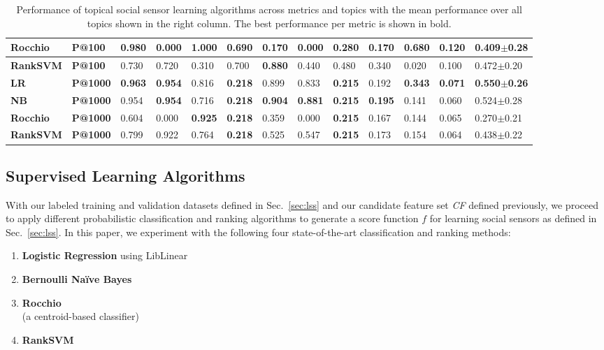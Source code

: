 \begin{table*}[t!]
{{\begin{tabular}{|l|l|l|l|l|l|l|l|l|l|l|l|l|}
\textbf{Rocchio} & \textbf{P@100} & \textbf{0.980} & 0.000 & \textbf{1.000} & 0.690 & 0.170 & 0.000 & 0.280 & 0.170 & 0.680 & 0.120 & 0.409$\pm$0.28 \\ \hline
\textbf{RankSVM} & \textbf{P@100} & 0.730 & 0.720 & 0.310 & 0.700 & \textbf{0.880} & 0.440 & 0.480 & 0.340 & 0.020 & 0.100 & 0.472$\pm$0.20 \\ \hline \hline
\textbf{LR} & \textbf{P@1000} & \textbf{0.963} & \textbf{0.954} & 0.816 & \textbf{0.218} & 0.899 & 0.833 & \textbf{0.215} & 0.192 & \textbf{0.343} & \textbf{0.071} & \textbf{0.550$\pm$0.26} \\ \hline
\textbf{NB} & \textbf{P@1000} & 0.954 & \textbf{0.954} & 0.716 & \textbf{0.218} & \textbf{0.904} & \textbf{0.881} & \textbf{0.215} & \textbf{0.195} & 0.141 & 0.060 & 0.524$\pm$0.28 \\ \hline
\textbf{Rocchio} & \textbf{P@1000} & 0.604 & 0.000 & \textbf{0.925} & \textbf{0.218} & 0.359 & 0.000 & \textbf{0.215} & 0.167 & 0.144 & 0.065 & 0.270$\pm$0.21 \\ \hline
\textbf{RankSVM} & \textbf{P@1000} & 0.799 & 0.922 & 0.764 & \textbf{0.218} & 0.525 & 0.547 & \textbf{0.215} & 0.173 & 0.154 & 0.064 & 0.438$\pm$0.22 \\ \hline
\end{tabular}
}}
\caption{Performance of topical social sensor learning algorithms across metrics and topics with the
mean performance over all topics shown in the right column.  The best performance per metric is shown in bold.} 
\label{table:results2}
\end{table*}

\subsection{Supervised Learning Algorithms}

With our labeled training and validation datasets defined in
Sec.~\ref{sec:lss} and our candidate feature set \textit{CF} defined
previously, we proceed to apply different probabilistic classification and ranking
algorithms to generate a score function $f$ for learning social sensors
as defined in Sec.~\ref{sec:lss}.  In this paper, we experiment with
the following four state-of-the-art classification and ranking methods:
\begin{enumerate}
\item {\bf Logistic Regression} using LibLinear~\cite{liblinear}
\item {\bf Bernoulli Na\"{i}ve Bayes}~\cite{mccallum98nb}
\item {\bf Rocchio}~\cite{manning_ir}\\(a centroid-based classifier)
\item {\bf RankSVM}~\cite{largescale_ranksvm}
\end{enumerate}

